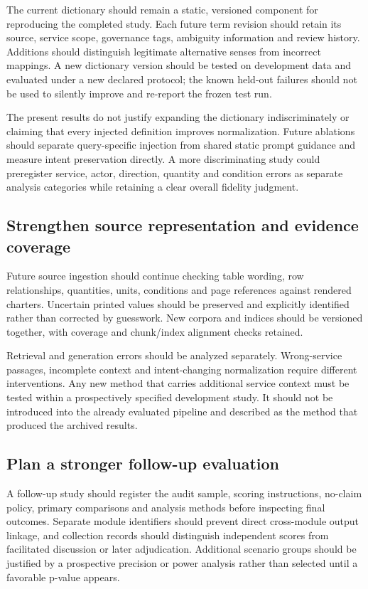 The current dictionary should remain a static, versioned component for reproducing the completed study. Each future term revision should retain its source, service scope, governance tags, ambiguity information and review history. Additions should distinguish legitimate alternative senses from incorrect mappings. A new dictionary version should be tested on development data and evaluated under a new declared protocol; the known held-out failures should not be used to silently improve and re-report the frozen test run.


The present results do not justify expanding the dictionary indiscriminately or claiming that every injected definition improves normalization. Future ablations should separate query-specific injection from shared static prompt guidance and measure intent preservation directly. A more discriminating study could preregister service, actor, direction, quantity and condition errors as separate analysis categories while retaining a clear overall fidelity judgment.


\subsection{Strengthen source representation and evidence coverage}

Future source ingestion should continue checking table wording, row relationships, quantities, units, conditions and page references against rendered charters. Uncertain printed values should be preserved and explicitly identified rather than corrected by guesswork. New corpora and indices should be versioned together, with coverage and chunk/index alignment checks retained.


Retrieval and generation errors should be analyzed separately. Wrong-service passages, incomplete context and intent-changing normalization require different interventions. Any new method that carries additional service context must be tested within a prospectively specified development study. It should not be introduced into the already evaluated pipeline and described as the method that produced the archived results.


\subsection{Plan a stronger follow-up evaluation}

A follow-up study should register the audit sample, scoring instructions, no-claim policy, primary comparisons and analysis methods before inspecting final outcomes. Separate module identifiers should prevent direct cross-module output linkage, and collection records should distinguish independent scores from facilitated discussion or later adjudication. Additional scenario groups should be justified by a prospective precision or power analysis rather than selected until a favorable p-value appears.


